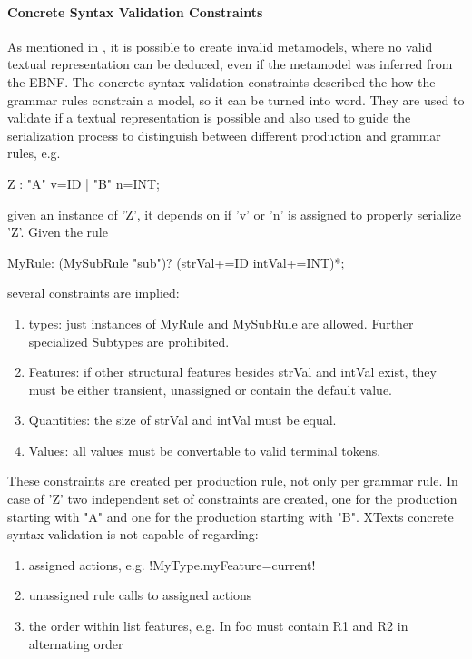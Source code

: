 \paragraph{Concrete Syntax Validation Constraints}
As mentioned in \cite{MofCfg}, it is possible to create invalid metamodels, where no valid textual representation can be deduced, even if the metamodel was inferred from the EBNF. The concrete syntax validation constraints described the how the grammar rules constrain a model, so it can be turned into word. They are used to validate if a textual representation is possible and also used to guide the serialization process to distinguish between different production and grammar rules, e.g.
\begin{xtxt}
Z 	:  "A" v=ID  
	|  "B" n=INT;
\end{xtxt}
given an instance of 'Z', it depends on if 'v' or 'n' is assigned to properly serialize 'Z'.
Given the rule
\begin{xtxt}
MyRule:	({MySubRule} "sub")? (strVal+=ID intVal+=INT)*;
\end{xtxt}
several constraints are implied:
\begin{enumerate}
	\item types: just instances of MyRule and MySubRule are allowed. Further specialized Subtypes are prohibited. 
	\item Features: if other structural features besides strVal and intVal exist, they must be either transient, unassigned or contain the default value.
	\item Quantities: the size of strVal and intVal must be equal.
	\item Values: all values must be convertable to valid terminal tokens.
\end{enumerate}
These constraints are created per production rule, not only per grammar rule. In case of 'Z' two independent set of constraints are created, one for the production starting with "A" and one for the production starting with "B".
XTexts concrete syntax validation is not capable of regarding:
\begin{enumerate}
	\item assigned actions, e.g. 
	\kode!{MyType.myFeature=current}!
	\item unassigned rule calls to assigned actions
	\item the order within list features, e.g. In  foo must contain R1 and R2 in alternating order
\end{enumerate}

